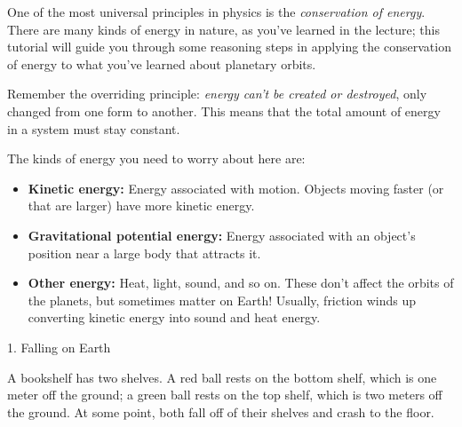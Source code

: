 \documentclass[12pt]{article}
\begin{document}
\Large
\centerline{}

\normalsize

One of the most universal principles in physics is the {\it conservation of energy}. There are many kinds
of energy in nature, as you've learned in the lecture; this tutorial will guide you through some reasoning
steps in applying the conservation of energy to what you've learned about planetary orbits.

Remember the overriding principle: {\it energy can't be created or destroyed}, only changed from one form
to another. This means that the total amount of energy in a system must stay constant.

The kinds of energy you need to worry about here are:

\begin{itemize}
\item {\bf Kinetic energy:} Energy associated with motion. Objects moving faster (or that are larger)
have more kinetic energy.

\item {\bf Gravitational potential energy:} Energy associated with an object's position near a large body that
attracts it. 

\item {\bf Other energy:} Heat, light, sound, and so on. These don't affect the orbits of the planets, but 
sometimes matter on Earth! Usually, friction winds up converting kinetic energy into sound and heat energy.

\end{itemize}

\Large 1. Falling on Earth
\normalsize

A bookshelf has two shelves. A red ball rests on the bottom shelf, which is one
meter off the ground; a green ball rests on the top shelf, which is two meters
off the ground. 
At some point, both fall off of their shelves and crash to the floor.
\end{document}
